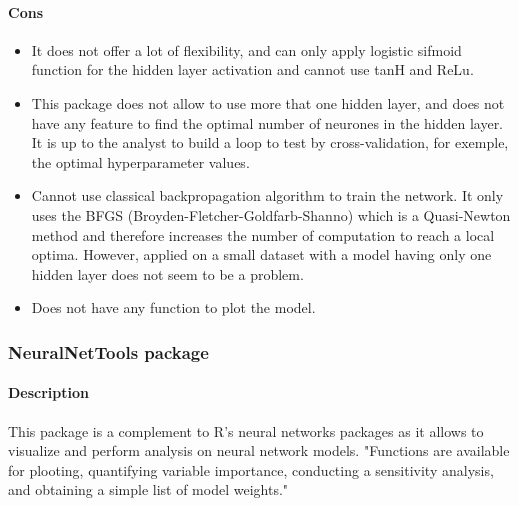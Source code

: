 \documentclass[letter]{article}\usepackage[]{graphicx}\usepackage[]{color}
\begin{document}
\paragraph{Cons}
\begin{itemize}
\item It does not offer a lot of flexibility, and can only apply logistic sifmoid function for the hidden layer activation and cannot use tanH and ReLu.
\item This package does not allow to use more that one hidden layer, and does not have any feature to find the optimal number of neurones in the hidden layer. It is up to the analyst to build a loop to test by cross-validation, for exemple, the optimal hyperparameter values.
\item Cannot use classical backpropagation algorithm to train the network. It only uses the BFGS (Broyden-Fletcher-Goldfarb-Shanno) which is a Quasi-Newton method and therefore increases the number of computation to reach a local optima. However, applied on a small dataset with a model having only one hidden layer does not seem to be a problem.
\item Does not have any function to plot the model.
\end{itemize}


\subsubsection{\textbf{NeuralNetTools package}}
\paragraph{Description}
This package is a complement to R's neural networks packages as it allows to visualize and perform analysis on neural network models. "Functions are available for plooting, quantifying variable importance, conducting a sensitivity analysis, and obtaining a simple list of model weights."
\end{document}

